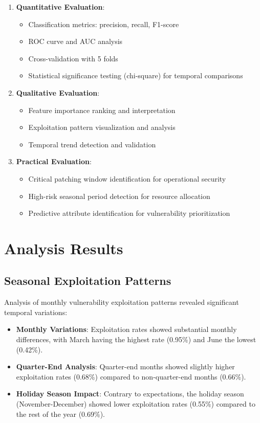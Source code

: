 \documentclass[runningheads]{llncs}
\begin{document}
\begin{enumerate}
    \item \textbf{Quantitative Evaluation}:
    \begin{itemize}
        \item Classification metrics: precision, recall, F1-score
        \item ROC curve and AUC analysis
        \item Cross-validation with 5 folds
        \item Statistical significance testing (chi-square) for temporal comparisons
    \end{itemize}
    
    \item \textbf{Qualitative Evaluation}:
    \begin{itemize}
        \item Feature importance ranking and interpretation
        \item Exploitation pattern visualization and analysis
        \item Temporal trend detection and validation
    \end{itemize}
    
    \item \textbf{Practical Evaluation}:
    \begin{itemize}
        \item Critical patching window identification for operational security
        \item High-risk seasonal period detection for resource allocation
        \item Predictive attribute identification for vulnerability prioritization
    \end{itemize}
\end{enumerate}

\section{Analysis Results}
\label{sec:results}

\subsection{Seasonal Exploitation Patterns}
Analysis of monthly vulnerability exploitation patterns revealed significant temporal variations:

\begin{itemize}
    \item \textbf{Monthly Variations}: Exploitation rates showed substantial monthly differences, with March having the highest rate (0.95\%) and June the lowest (0.42\%).
    
    \item \textbf{Quarter-End Analysis}: Quarter-end months showed slightly higher exploitation rates (0.68\%) compared to non-quarter-end months (0.66\%).
    
    \item \textbf{Holiday Season Impact}: Contrary to expectations, the holiday season (November-December) showed lower exploitation rates (0.55\%) compared to the rest of the year (0.69\%).
\end{itemize}
\end{document}
